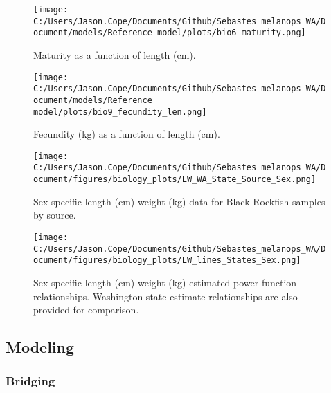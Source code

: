 \documentclass[11pt,
  letterpaper,
]{article}
\begin{document}
\pagebreak

\begin{figure}
{\centering
\texttt{[image: C:/Users/Jason.Cope/Documents/Github/Sebastes\_melanops\_WA/Document/models/Reference model/plots/bio6\_maturity.png]}
}
\caption{Maturity as a function of length (cm).\label{fig:maturity}}
\end{figure}

\pagebreak

\begin{figure}
{\centering
\texttt{[image: C:/Users/Jason.Cope/Documents/Github/Sebastes\_melanops\_WA/Document/models/Reference model/plots/bio9\_fecundity\_len.png]}
}
\caption{Fecundity (kg) as a function of length (cm).\label{fig:fecundity}}
\end{figure}

\pagebreak

\begin{figure}
{\centering
\texttt{[image: C:/Users/Jason.Cope/Documents/Github/Sebastes\_melanops\_WA/Document/figures/biology\_plots/LW\_WA\_State\_Source\_Sex.png]}
}
\caption{Sex-specific length (cm)-weight (kg) data for Black Rockfish samples by source.\label{fig:len-weight-data}}
\end{figure}

\pagebreak

\begin{figure}
{\centering
\texttt{[image: C:/Users/Jason.Cope/Documents/Github/Sebastes\_melanops\_WA/Document/figures/biology\_plots/LW\_lines\_States\_Sex.png]}
}
\caption{Sex-specific length (cm)-weight (kg) estimated power function relationships. Washington state estimate relationships are also provided for comparison.\label{fig:len-weight-or-wa}}
\end{figure}

\clearpage

\hypertarget{modeling}{%
\subsection{Modeling}\label{modeling}}

\hypertarget{bridging}{%
\subsubsection{Bridging}\label{bridging}}
\end{document}
